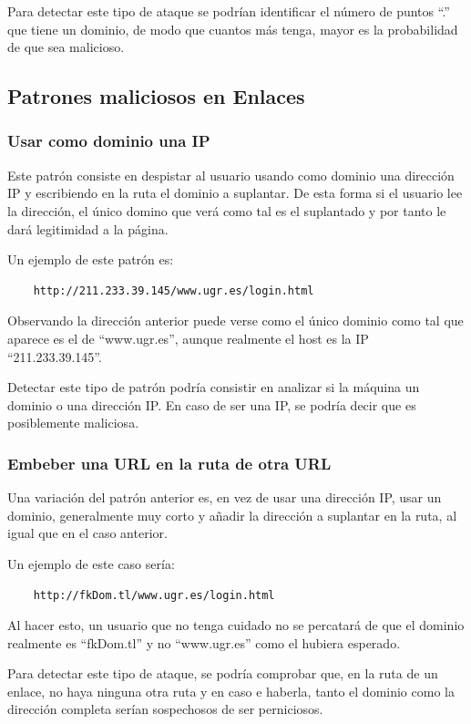 Para detectar este tipo de ataque se podrían identificar el número de puntos “.” que tiene un dominio, de modo que cuantos más tenga, mayor es la probabilidad de que sea malicioso.

\subsection{Patrones maliciosos en Enlaces}
\subsubsection{Usar como dominio una IP}
Este patrón consiste en despistar al usuario usando como dominio una dirección IP y escribiendo en la ruta el dominio a suplantar. De esta forma si el usuario lee la dirección, el único domino que verá como tal es el suplantado y por tanto le dará legitimidad a la página. 

Un ejemplo de este patrón es: 

\begin{verbatim}
    http://211.233.39.145/www.ugr.es/login.html 
\end{verbatim}

Observando la dirección anterior puede verse como el único dominio como tal que aparece es el de “www.ugr.es”, aunque realmente el host es la IP “211.233.39.145”.

Detectar este tipo de patrón podría consistir en analizar si la máquina un dominio o una dirección IP. En caso de ser una IP, se podría decir que es posiblemente maliciosa. 

\subsubsection{Embeber una URL en la ruta de otra URL}
Una variación del patrón anterior es, en vez de usar una dirección IP, usar un dominio, generalmente muy corto y añadir la dirección a suplantar en la ruta, al igual que en el caso anterior.

Un ejemplo de este caso sería: 

\begin{verbatim}
    http://fkDom.tl/www.ugr.es/login.html 
\end{verbatim}

Al hacer esto, un usuario que no tenga cuidado no se percatará de que el dominio realmente es “fkDom.tl” y no “www.ugr.es” como el hubiera esperado. 

Para detectar este tipo de ataque, se podría comprobar que, en la ruta de un enlace, no haya ninguna otra ruta y en caso e haberla, tanto el dominio como la dirección completa serían sospechosos de ser perniciosos. 


